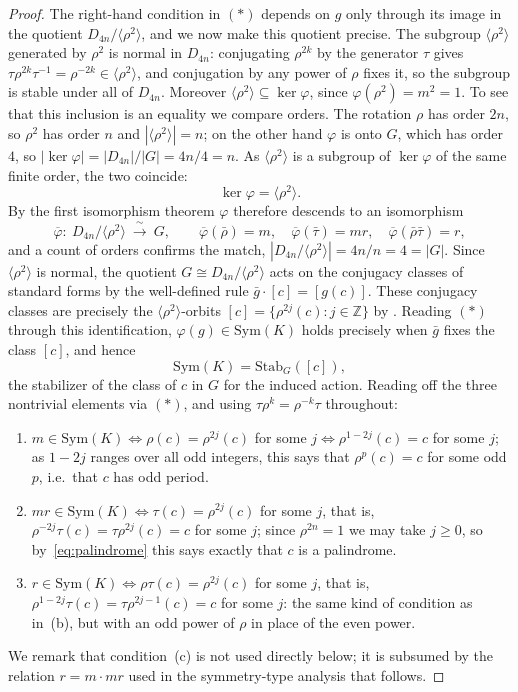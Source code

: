 \documentclass[11pt]{article}
\theoremstyle{definition}
\begin{document}
\begin{proof}
The right-hand condition in $(\ast)$ depends on $g$ only through its image in
the quotient $D_{4n}/\langle\rho^{2}\rangle$, and we now make this quotient precise. The
subgroup $\langle\rho^{2}\rangle$ generated by $\rho^{2}$ is normal in $D_{4n}$:
conjugating $\rho^{2k}$ by the generator $\tau$ gives
$\tau\rho^{2k}\tau^{-1}=\rho^{-2k}\in\langle\rho^{2}\rangle$, and conjugation by any power
of $\rho$ fixes it, so the subgroup is stable under all of $D_{4n}$. Moreover
$\langle\rho^{2}\rangle\subseteq\ker\varphi$, since $\varphi(\rho^{2})=m^{2}=1$. To see
that this inclusion is an equality we compare orders. The rotation $\rho$ has order $2n$,
so $\rho^{2}$ has order $n$ and $|\langle\rho^{2}\rangle|=n$; on the other hand $\varphi$
is onto $G$, which has order $4$, so $|\ker\varphi|=|D_{4n}|/|G|=4n/4=n$. As
$\langle\rho^{2}\rangle$ is a subgroup of $\ker\varphi$ of the same finite order, the two
coincide:
\[
\ker\varphi=\langle\rho^{2}\rangle .
\]
By the first isomorphism theorem $\varphi$ therefore descends to an isomorphism
\[
\overline{\varphi}\colon\ D_{4n}/\langle\rho^{2}\rangle\ \xrightarrow{\ \sim\ }\ G,
\qquad
\overline{\varphi}(\bar\rho)=m,\quad
\overline{\varphi}(\bar\tau)=mr,\quad
\overline{\varphi}(\bar\rho\bar\tau)=r,
\]
and a count of orders confirms the match, $|D_{4n}/\langle\rho^{2}\rangle|=4n/n=4=|G|$.
Since $\langle\rho^{2}\rangle$ is normal, the quotient $G\cong
D_{4n}/\langle\rho^{2}\rangle$ acts on the conjugacy classes of standard forms by the
well-defined rule $\bar g\cdot[c]=[g(c)]$. These conjugacy classes are precisely the
$\langle\rho^{2}\rangle$-orbits $[c]=\{\rho^{2j}(c):j\in\mathbb{Z}\}$ by
. Reading $(\ast)$ through this identification,
$\varphi(g)\in\mathrm{Sym}(K)$ holds precisely when $\bar g$ fixes the class $[c]$, and hence
\[
\mathrm{Sym}(K)=\mathrm{Stab}_{G}([c]),
\]
the stabilizer of the class of $c$ in $G$ for the induced action. Reading off the three nontrivial elements via
$(\ast)$, and using $\tau\rho^{k}=\rho^{-k}\tau$ throughout:
\begin{enumerate}[label=\textup{(\alph*)}]
\item $m\in\mathrm{Sym}(K)\iff\rho(c)=\rho^{2j}(c)$ for some $j\iff\rho^{1-2j}(c)=c$ for
some $j$; as $1-2j$ ranges over all odd integers, this says that $\rho^{p}(c)=c$ for some
odd $p$, i.e.\ that $c$ has odd period.
\item $mr\in\mathrm{Sym}(K)\iff\tau(c)=\rho^{2j}(c)$ for some $j$, that is,
$\rho^{-2j}\tau(c)=\tau\rho^{2j}(c)=c$ for some $j$; since $\rho^{2n}=1$ we
may take $j\ge0$, so by~\eqref{eq:palindrome} this says exactly that $c$ is a palindrome.
\item $r\in\mathrm{Sym}(K)\iff\rho\tau(c)=\rho^{2j}(c)$ for some $j$, that is,
$\rho^{1-2j}\tau(c)=\tau\rho^{2j-1}(c)=c$ for some $j$: the same kind of
condition as in~(b), but with an odd power of $\rho$ in place of the even power.
\end{enumerate}
\noindent We remark that condition~(c) is not used directly below; it is subsumed by the relation $r=m\cdot mr$ used in the symmetry-type analysis that follows.


\end{proof}
\end{document}
